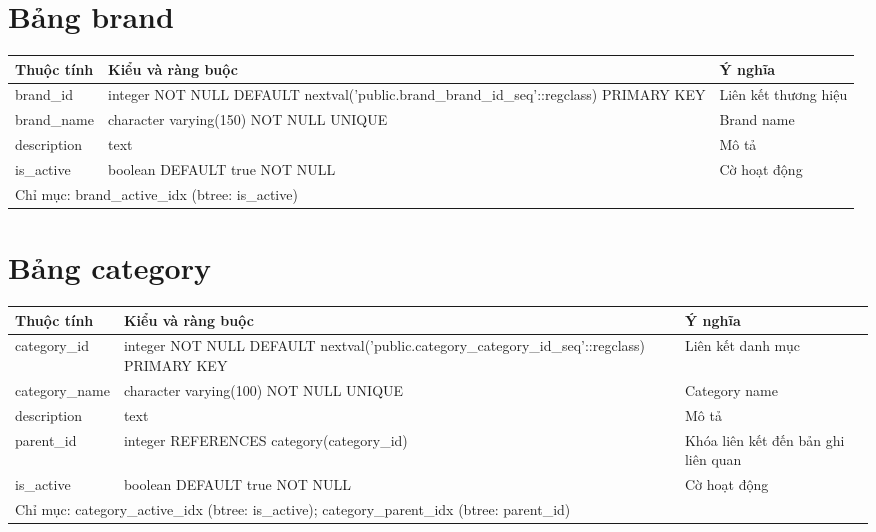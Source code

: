 \section{Bảng brand}
\begin{longtable}{|p{}|p{}|p{}|}\hline
\textbf{Thuộc tính}&\textbf{Kiểu và ràng buộc}&\textbf{Ý nghĩa}\\\hline\endhead
brand\_id & integer NOT NULL DEFAULT nextval('public.brand\_brand\_id\_seq'::regclass) PRIMARY KEY & Liên kết thương hiệu\\\hline
brand\_name & character varying(150) NOT NULL UNIQUE & Brand name\\\hline
description & text & Mô tả\\\hline
is\_active & boolean DEFAULT true NOT NULL & Cờ hoạt động\\\hline
\multicolumn{3}{|p{0.93\textwidth}|}{Chỉ mục: brand\_active\_idx (btree: is\_active)}\\\hline
\end{longtable}
\normalsize
\section{Bảng category}
\begin{longtable}{|p{}|p{}|p{}|}\hline
\textbf{Thuộc tính}&\textbf{Kiểu và ràng buộc}&\textbf{Ý nghĩa}\\\hline\endhead
category\_id & integer NOT NULL DEFAULT nextval('public.category\_category\_id\_seq'::regclass) PRIMARY KEY & Liên kết danh mục\\\hline
category\_name & character varying(100) NOT NULL UNIQUE & Category name\\\hline
description & text & Mô tả\\\hline
parent\_id & integer REFERENCES category(category\_id) & Khóa liên kết đến bản ghi liên quan\\\hline
is\_active & boolean DEFAULT true NOT NULL & Cờ hoạt động\\\hline
\multicolumn{3}{|p{0.93\textwidth}|}{Chỉ mục: category\_active\_idx (btree: is\_active); category\_parent\_idx (btree: parent\_id)}\\\hline
\end{longtable}
\normalsize
